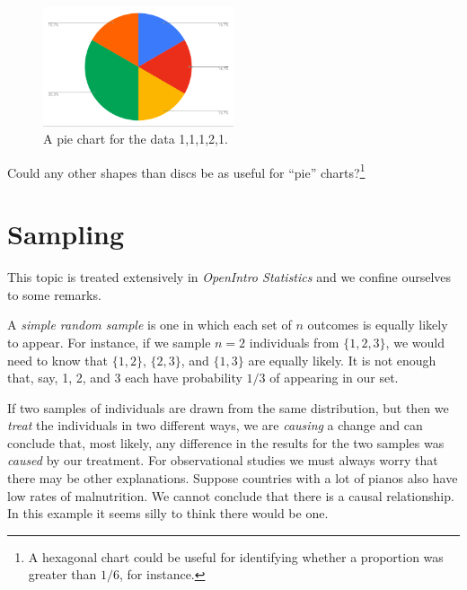 \begin{figure}[h]
   \centering
   \includegraphics[width=0.5\textwidth]{ch_intro_to_data/figures/pie-chart-s4cs}
   \caption{A pie chart for the data 1,1,1,2,1.}
   \label{emailNumberPieChart}
\end{figure}

\begin{exercise}
	Could any other shapes than discs be as useful for ``pie'' charts?\footnote{A hexagonal chart could be useful for identifying whether a proportion was greater than $1/6$, for instance.}
\end{exercise}

\section{Sampling}

This topic is treated extensively in \emph{OpenIntro Statistics} and we confine ourselves to some remarks.

A \emph{simple random sample} is one in which each set of $n$ outcomes is equally likely to appear.
For instance, if we sample $n=2$ individuals from $\{1,2,3\}$, we would need to know that $\{1,2\}$, $\{2,3\}$, and $\{1,3\}$ are equally likely. It is not enough that, say, 1, 2, and 3 each have probability $1/3$ of appearing in our set.

If two samples of individuals are drawn from the same distribution, but then we \emph{treat} the individuals in two different ways, we are \emph{causing} a change and can conclude that, most likely, any difference in the results for the two samples was \emph{caused} by our treatment. For observational studies we must always worry that there may be other explanations. Suppose countries with a lot of pianos also have low rates of malnutrition. We cannot conclude that there is a causal relationship. In this example it seems silly to think there would be one.


